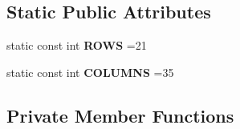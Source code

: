 \subsection*{Static Public Attributes}
\begin{DoxyCompactItemize}
\item 
\mbox{\label{class_xionix_a22bcd2df98afa822983c70afccdfe7f4}} 
static const int {\bfseries R\+O\+WS} =21
\item 
\mbox{\label{class_xionix_a06ea03be7a68a04ff9d4012806ef2be8}} 
static const int {\bfseries C\+O\+L\+U\+M\+NS} =35
\end{DoxyCompactItemize}
\subsection*{Private Member Functions}
